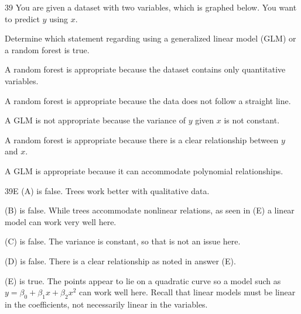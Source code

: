 \begin{question}{39}
You are given a dataset with two variables, which is graphed below. You want to predict $y$ using $x$.


Determine which statement regarding using a generalized linear model (GLM) or a random forest is true.

\begin{choices}
\item A random forest is appropriate because the dataset contains only quantitative variables.
\item A random forest is appropriate because the data does not follow a straight line.
\item A GLM is not appropriate because the variance of $y$ given $x$ is not constant.
\item A random forest is appropriate because there is a clear relationship between $y$ and $x$.
\item A GLM is appropriate because it can accommodate polynomial relationships.
\end{choices}
\end{question}
\begin{solution}{39}{E}
(A) is false. Trees work better with qualitative data.

(B) is false. While trees accommodate nonlinear relations, as seen in (E) a linear model can work very well here.

(C) is false. The variance is constant, so that is not an issue here.

(D) is false. There is a clear relationship as noted in answer (E).

(E) is true. The points appear to lie on a quadratic curve so a model such as $y = \beta_0 + \beta_1 x + \beta_2 x^2$ can work well here. Recall that linear models must be linear in the coefficients, not necessarily linear in the variables.
\end{solution}

